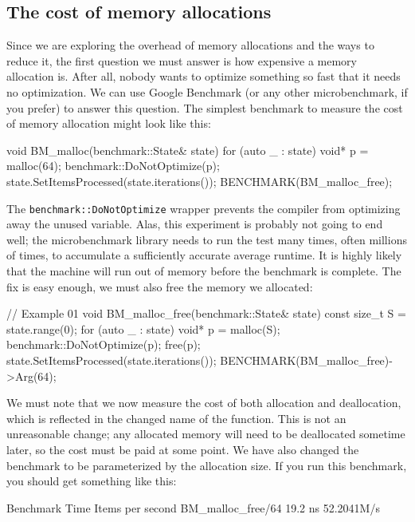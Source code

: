 \subsection{The cost of memory allocations}

Since we are exploring the overhead of memory allocations and the ways to reduce it, the first question we must answer is how expensive a memory allocation is. After all, nobody wants to optimize something so fast that it needs no optimization. We can use Google Benchmark (or any other microbenchmark, if you prefer) to answer this question. The simplest benchmark to measure the cost of memory allocation might look like this:

\begin{code}
void BM_malloc(benchmark::State& state) {
  for (auto _ : state) {
    void* p = malloc(64);
    benchmark::DoNotOptimize(p);
  }
  state.SetItemsProcessed(state.iterations());
}
BENCHMARK(BM_malloc_free);
\end{code}

The \texttt{benchmark::DoNotOptimize} wrapper prevents the compiler from optimizing away the unused variable. Alas, this experiment is probably not going to end well; the microbenchmark library needs to run the test many times, often millions of times, to accumulate a sufficiently accurate average runtime. It is highly likely that the machine will run out of memory before the benchmark is complete. The fix is easy enough, we must also free the memory we allocated:

\begin{code}
// Example 01
void BM_malloc_free(benchmark::State& state) {
  const size_t S = state.range(0);
  for (auto _ : state) {
    void* p = malloc(S);
    benchmark::DoNotOptimize(p); free(p);
  }
  state.SetItemsProcessed(state.iterations());
}
BENCHMARK(BM_malloc_free)->Arg(64);
\end{code}

We must note that we now measure the cost of both allocation and deallocation, which is reflected in the changed name of the function. This is not an unreasonable change; any allocated memory will need to be deallocated sometime later, so the cost must be paid at some point. We have also changed the benchmark to be parameterized by the allocation size. If you run this benchmark, you should get something like this:

\begin{code}
Benchmark                 Time   Items per second
BM_malloc_free/64        19.2 ns 52.2041M/s
\end{code}

